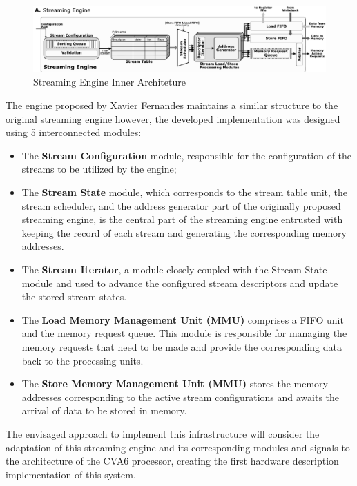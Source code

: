 \begin{figure}[H]
    \centering
    \includegraphics[width=1\linewidth]{images/uve-engine.pdf}
    \caption{Streaming Engine Inner Architeture}
    \label{fig:xav-engine}
\end{figure}

The engine proposed by Xavier Fernandes \cite{thesis-xf} maintains a similar structure to the original streaming engine however, the developed implementation was designed using 5 interconnected modules:
\begin{itemize}
    \item The \textbf{Stream Configuration} module, responsible for the configuration of the streams to be utilized by the engine;
    \item The \textbf{Stream State} module, which corresponds to the stream table unit, the stream scheduler, and the address generator part of the originally proposed streaming engine, is the central part of the streaming engine entrusted with keeping the record of each stream and generating the corresponding memory addresses.
    \item The \textbf{Stream Iterator}, a module closely coupled with the Stream State module and used to advance the configured stream descriptors and update the stored stream states.
    \item The \textbf{Load Memory Management Unit (MMU)} comprises a FIFO unit and the memory request queue. This module is responsible for managing the memory requests that need to be made and provide the corresponding data back to the processing units.
    \item The \textbf{Store Memory Management Unit (MMU)} stores the memory addresses corresponding to the active stream configurations and awaits the arrival of data to be stored in memory.
    
\end{itemize}

The envisaged approach to implement this infrastructure will consider the adaptation of this streaming engine and its corresponding modules and signals to the architecture of the CVA6 processor, creating the first hardware description implementation of this system.



